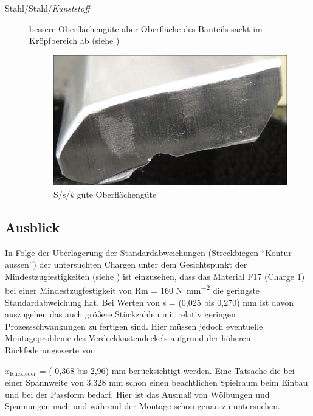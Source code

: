 \documentclass[12pt,a4paper,parskip,twoside,BCOR5mm,headsepline]{scrartcl}
\begin{document}
\begin{description*}
\begin{description}
\item[Stahl/Stahl/\emph{Kunststoff}] bessere Oberflächengüte aber Oberfläche des Bauteils sackt im Kröpfbereich ab (siehe )
\begin{figure}[H]
\centering
\includegraphics[width=.8\textwidth]{Ssk1}
\caption{S/s/\emph{k} gute Oberflächengüte }
\label{fig:Ssk1}
\end{figure}











\end{description}










\newpage

\subsection{Ausblick}
In Folge der Überlagerung der Standardabweichungen (Streckbiegen "`Kontur aussen"') der untersuchten Chargen unter dem Gesichtspunkt der Mindestzugfestigkeiten (siehe ) ist einzusehen, dass das Material F17 (Charge 1) bei einer Mindestzugfestigkeit von Rm = 160  \si{\newton\per\milli\meter\squared}  die geringste Standardabweichung hat. Bei Werten von s = (0,025  bis 0,270) \si{\milli\meter}  ist davon auszugehen das auch größere Stückzahlen mit relativ geringen Prozessschwankungen zu fertigen sind. Hier müssen jedoch eventuelle Montageprobleme des Verdeckkastendeckels aufgrund der höheren Rückfederungswerte von {$x_{\text{Rückfeder}}$ = (-0,368  bis 2,96) \si{\milli\meter} berücksichtigt werden. Eine Tatsache die bei einer Spannweite von 3,328 \si{\milli\meter} schon einen beachtlichen Spielraum beim Einbau und bei der Passform bedarf.  %
Hier ist das Ausmaß von Wölbungen und Spannungen nach und während der Montage schon genau zu untersuchen.

}
\end{description*}
\end{document}
